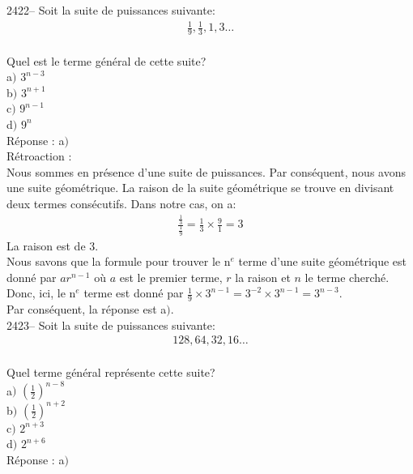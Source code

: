 \documentclass[letterpaper, 12pt]{article}
\begin{document}

2422-- Soit la suite de puissances suivante:\\
\begin{eqnarray*}
\frac{1}{9}, \frac{1}{3}, 1, 3 \ldots
\end{eqnarray*}\\
Quel est le terme g\'en\'eral de cette suite?\\

a$)$ $3^{n-3} $\\[2mm]
b$)$ $3^{n+1} $\\[2mm]
c$)$ $9^{n-1} $\\[2mm]
d$)$ $9^{n}$\\

R\'eponse : a$)$\\

R\'etroaction :\\
Nous sommes en pr\'esence d'une suite de puissances. Par cons\'equent, nous avons une suite g\'eom\'etrique. La raison de la suite g\'eom\'etrique se trouve en divisant deux termes cons\'ecutifs. Dans notre cas, on a:
\begin{eqnarray*}
 \frac{\frac{1}{3}}{ \frac{1}{9}}=\frac{1}{3}\times \frac{9}{1}=3
\end{eqnarray*}
La raison est de 3.\\
Nous savons que la formule pour trouver le n$^{e}$ terme d'une suite g\'eom\'etrique est donn\'e par $ar^{n-1}$ o\`u $a$ est le premier terme, $r$ la raison et $n$ le terme cherch\'e. Donc, ici, le n$^{e}$ terme est donn\'e par $\frac{1}{9}\times 3^{n-1}=3^{-2}\times3^{n-1}=3^{n-3}$.\\
Par cons\'equent, la r\'eponse est a$)$.\\

2423-- Soit la suite de puissances suivante:\\
\begin{eqnarray*}
128, 64, 32, 16 \ldots
\end{eqnarray*}\\
Quel terme g\'en\'eral repr\'esente cette suite?\\

a$)$ $\left( \frac{1}{2}\right) ^{n-8} $\\[2mm]
b$)$ $\left( \frac{1}{2}\right) ^{n+2} $\\[2mm]
c$)$ $2^{n+3} $\\[2mm]
d$)$ $2^{n+6} $\\

R\'eponse : a$)$\\
\end{document}
